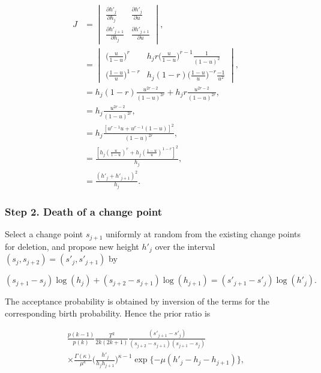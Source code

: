 \documentclass[../main.tex]{subfiles}
\begin{document}
\begin{align}
J &= 
\begin{vmatrix}
\frac{\partial h'_j}{\partial h_j} & \frac{\partial h'_j}{\partial u} \\
\frac{\partial h'_{j+1}}{\partial h_j} & \frac{\partial h'_{j+1}}{\partial u} 
\end{vmatrix}, \\
&= \begin{vmatrix}
\big(\frac{u}{1-u}\big)^r & h_j r \big(\frac{u}{1-u}\big)^{r-1} \frac{1}{(1-u)^2} \\
\big(\frac{1-u}{u}\big)^{1-r} & h_j (1-r) \big(\frac{1-u}{u}\big)^{-r} \frac{-1}{u^2}
\end{vmatrix}, \\
&= h_j (1-r) \frac{u^{2r-2}}{(1-u)^{2r}} + h_j r \frac{u^{2r-2}}{(1-u)^{2r}}, \\
&= h_j \frac{u^{2r-2}}{(1-u)^{2r}}, \\
&= h_j \frac{ [u^{r-1} u + u^{r-1}(1-u)]^2}{(1-u)^{2r}}, \\
&= \frac{[h_j (\frac{u}{1-u})^r + h_j (\frac{1-u}{u})^{1-r} ]^2}{h_j}, \\
&= \frac{(h'_j + h'_{j+1})^2}{h_j}.
\end{align}  


    \subsubsection{Step 2. Death of a change point}
 Select a change point $s_{j+1}$ uniformly at random from the existing change points for deletion, and propose new height $h'_j$ over the interval $(s_{j},s_{j+2}) = (s'_j,s'_{j+1})$ by
 
 \begin{equation}
 (s_{j+1} - s_j) \log(h_j) + (s_{j+2} - s_{j+1}) \log (h_{j+1} ) = (s'_{j+1} - s'_j) \log(h'_j) .
 \end{equation} 

The acceptance probability is obtained by inversion of the terms for the corresponding birth probability. Hence the prior ratio is

\begin{multline}
\frac{p(k-1)} {p(k)}\frac{T^2}{2k(2k+1)} \frac{(s'_{j+1} - s'_j)}  {(s_{j+2} - s_{j+1}) (s_{j+1} - s_j) }
 \\ \times \frac{\Gamma (\kappa)}{\mu^\kappa} \bigg(\frac{h'_j}{h_j h_{j+1}}\bigg)^{\kappa-1} \exp \{- \mu (h'_j  - h_j - h_{j+1}) \}, 
\end{multline}
\end{document}
